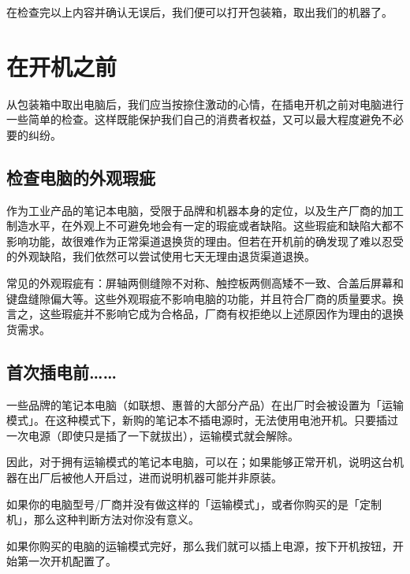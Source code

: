 在检查完以上内容并确认无误后，我们便可以打开包装箱，取出我们的机器了。

\section{在开机之前}

从包装箱中取出电脑后，我们应当按捺住激动的心情，在插电开机之前对电脑进行一些简单的检查。这样既能保护我们自己的消费者权益，又可以最大程度避免不必要的纠纷。

\subsection{检查电脑的外观瑕疵}

作为工业产品的笔记本电脑，受限于品牌和机器本身的定位，以及生产厂商的加工制造水平，在外观上不可避免地会有一定的瑕疵或者缺陷。这些瑕疵和缺陷大都不影响功能，故很难作为正常渠道退换货的理由。但若在开机前的确发现了难以忍受的外观缺陷，我们依然可以尝试使用七天无理由退货渠道退换。

常见的外观瑕疵有：屏轴两侧缝隙不对称、触控板两侧高矮不一致、合盖后屏幕和键盘缝隙偏大等。这些外观瑕疵不影响电脑的功能，并且符合厂商的质量要求。换言之，这些瑕疵并不影响它成为合格品，厂商有权拒绝以上述原因作为理由的退换货需求。

\subsection{首次插电前……}

一些品牌的笔记本电脑（如联想、惠普的大部分产品）在出厂时会被设置为「运输模式」。在这种模式下，新购的笔记本不插电源时，无法使用电池开机。只要插过一次电源（即使只是插了一下就拔出），运输模式就会解除。

因此，对于拥有运输模式的笔记本电脑，可以在；如果能够正常开机，说明这台机器在出厂后被他人开启过，进而说明机器可能并非原装。

\begin{note}
  如果你的电脑型号/厂商并没有做这样的「运输模式」，或者你购买的是「定制机」，那么这种判断方法对你没有意义。
\end{note}

如果你购买的电脑的运输模式完好，那么我们就可以插上电源，按下开机按钮，开始第一次开机配置了。

